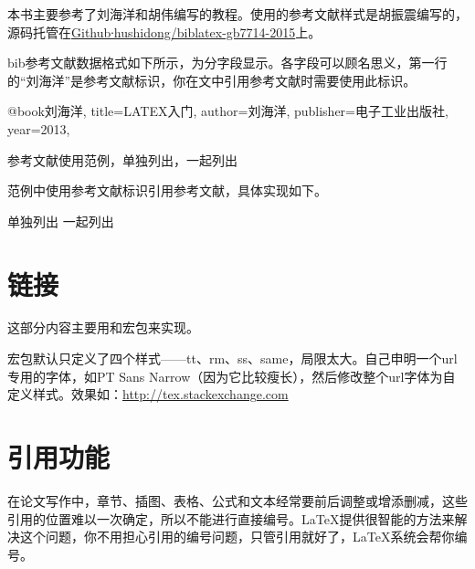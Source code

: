 本书主要参考了刘海洋\cite{刘海洋}和胡伟\cite{胡伟}编写的教程。使用的参考文献样式是胡振震编写的，源码托管在\href{https://github.com/hushidong/biblatex-gb7714-2015}{Github∙hushidong/biblatex-gb7714-2015}上。

\begin{latex}
\usepackage[
    backend=biber,%
    style=gb7714-2015%
    ]{biblatex}


\printbibliography%
\end{latex}

bib参考文献数据格式如下所示，为分字段显示。各字段可以顾名思义，第一行的“刘海洋”是参考文献标识，你在文中引用参考文献时需要使用此标识。

\begin{latex}
@book{刘海洋,
    title={LATEX入门},
    author={刘海洋},
    publisher={电子工业出版社},
    year={2013},
}
\end{latex}

参考文献使用范例，单独列出\cite{刘海洋}\cite{胡伟}，一起列出\cite{刘海洋,胡伟}

范例中使用参考文献标识引用参考文献，具体实现如下。

\begin{latex}
单独列出\cite{刘海洋}\cite{胡伟}
一起列出\cite{刘海洋,胡伟}
\end{latex}

\section{链接}
这部分内容主要用和宏包来实现。


宏包默认只定义了四个样式——tt、rm、ss、same，局限太大。自己申明一个url专用的字体，如PT Sans Narrow（因为它比较瘦长），然后修改整个url字体为自定义样式。效果如：\url{http://tex.stackexchange.com}


\begin{latex}
\newfontfamily{}
\def\UrlFont{\myurlfont}
\end{latex}

\section{引用功能}\label{tools-ref}
在论文写作中，章节、插图、表格、公式和文本经常要前后调整或增添删减，这些引用的位置难以一次确定，所以不能进行直接编号。\LaTeX 提供很智能的方法来解决这个问题，你不用担心引用的编号问题，只管引用就好了，\LaTeX 系统会帮你编号。


